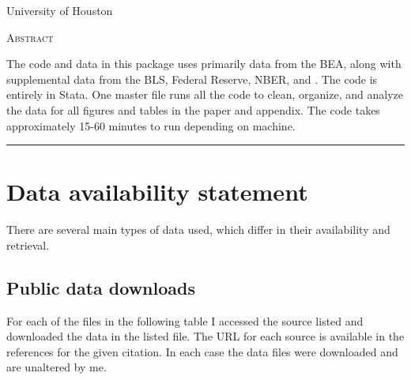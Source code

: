 \documentclass[11pt]{article}
\begin{document}
\begin{titlepage}
\vspace{2in} \noindent {\large \today}

\vspace{.5in} 

\vspace{.25in} 

\vspace{.05in} \noindent University of Houston

\vfill \noindent \textsc{Abstract} \hrulefill

\vspace{.05in} \noindent The code and data in this package uses primarily data from the BEA, along with supplemental data from the BLS, Federal Reserve, NBER, and \cite{dleu2020}. The code is entirely in Stata. One master file runs all the code to clean, organize, and analyze the data for all figures and tables in the paper and appendix. The code takes approximately 15-60 minutes to run depending on machine. 
 
\vspace{.1in} \hrule

\vspace{.1in} 
\end{titlepage}

\pagebreak 

\tableofcontents
\listoffigures
\listoftables

\section{Data availability statement}
\onehalfspacing There are several main types of data used, which differ in their availability and retrieval.

\subsection{Public data downloads}
For each of the files in the following table I accessed the source listed and downloaded the data in the listed file. The URL for each source is available in the references for the given citation. In each case the data files were downloaded and are unaltered by me.
\end{document}
